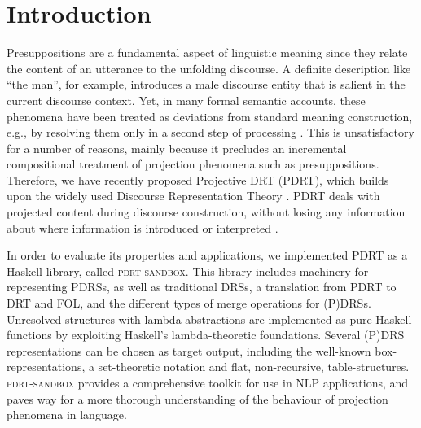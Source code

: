 \section{Introduction}

Presuppositions are a fundamental aspect of linguistic
meaning since they relate the content of an utterance to the unfolding
discourse. A definite description like ``the man'', for example, introduces
a male discourse entity that is salient in the current discourse context.
Yet, in many formal semantic accounts, these phenomena have been treated as
deviations from standard meaning construction, e.g., by resolving them only
in a second step of processing \cite{sandt1992presupposition}. This is unsatisfactory
for a number of reasons, mainly because it precludes an incremental
compositional treatment of projection phenomena such as presuppositions.
Therefore, we have recently proposed Projective DRT (PDRT), which builds
upon the widely used Discourse Representation Theory \cite{kamp1981theory,kamp1993discourse}.
PDRT deals with projected content during discourse construction, without
losing any information about where information is introduced or interpreted
\cite{venhuizen2013iwcs}.

In order to evaluate its properties and applications, we implemented PDRT as
a Haskell library, called \textsc{pdrt-sandbox}. This library includes machinery
for representing PDRSs, as well as traditional DRSs, a translation from PDRT
to DRT and FOL, and the different types of merge operations for (P)DRSs.
Unresolved structures with lambda-abstractions \cite{muskens1996combining} are
implemented as pure Haskell functions by exploiting Haskell's
lambda-theoretic foundations. Several (P)DRS representations can be chosen
as target output, including the well-known box-representations,
a set-theoretic notation and flat, non-recursive, table-structures.
\textsc{pdrt-sandbox} provides a comprehensive toolkit for use in NLP applications,
and paves way for a more thorough understanding of the behaviour of
projection phenomena in language.  

